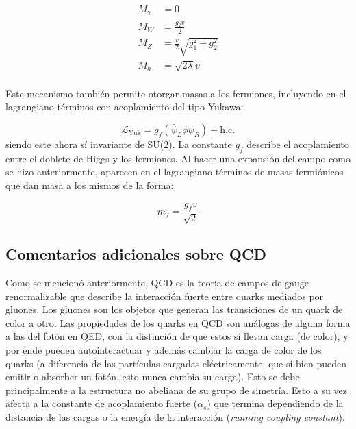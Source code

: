 \begin{equation}
\begin{split}
	M_{\gamma} & = 0 \\
	M_{W} & = \frac{g_2 v}{2} \\
	M_{Z} & = \frac{v}{2}\sqrt{g_1^2 + g_2^2} \\
	M_{h} & = \sqrt{2\lambda}v \\
\end{split}
\end{equation}

Este mecanismo también permite otorgar masas a los fermiones, incluyendo en el lagrangiano términos con acoplamiento del tipo Yukawa:

\begin{equation}
	\mathcal{L}_{\text{Yuk}} = g_f(\bar{\psi}_L\phi \psi_R) + \text{h.c.}
\end{equation}
%
siendo este ahora sí invariante de SU(2). La constante $g_f$ describe el acoplamiento entre el doblete de Higgs y los fermiones. Al hacer una expansión del campo como se hizo anteriormente, aparecen en el lagrangiano términos de masas fermiónicos que dan masa a los mismos de la forma:

\begin{equation}
m_f = \frac{g_f v}{\sqrt{2}}
\end{equation}



\subsection{Comentarios adicionales sobre QCD}\label{sec:qcd}

Como se mencionó anteriormente, QCD \cite{qcdcollider} es la teoría de campos de gauge renormalizable
que describe la interacción fuerte entre quarks mediados por gluones. Los gluones son los objetos que generan las transiciones de un quark de color a otro. Las propiedades de los quarks en QCD son análogas de alguna forma a las del fotón en QED, con la distinción de que estos sí llevan carga (de color), y por ende pueden autointeractuar y además cambiar la carga  de color de los quarks (a diferencia de las partículas cargadas eléctricamente, que si bien pueden emitir o absorber un fotón, esto nunca cambia su carga). Esto se debe principalmente a la estructura no abeliana de su grupo de simetría.
Esto a su vez afecta a la constante de acoplamiento fuerte ($\alpha_s$) que termina dependiendo de la distancia de las cargas o la energía de la interacción (\textit{running coupling constant}). 

